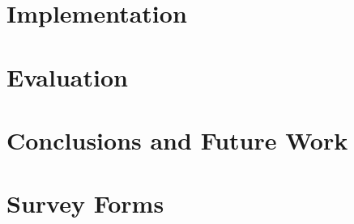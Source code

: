 \documentclass[12pt,twoside]{report}
\begin{document}
\chapter{Implementation}






\chapter{Evaluation}



\chapter{Conclusions and Future Work}


% 

% 

% 

\printbibliography

\appendix
\chapter{Survey Forms}

\end{document}
